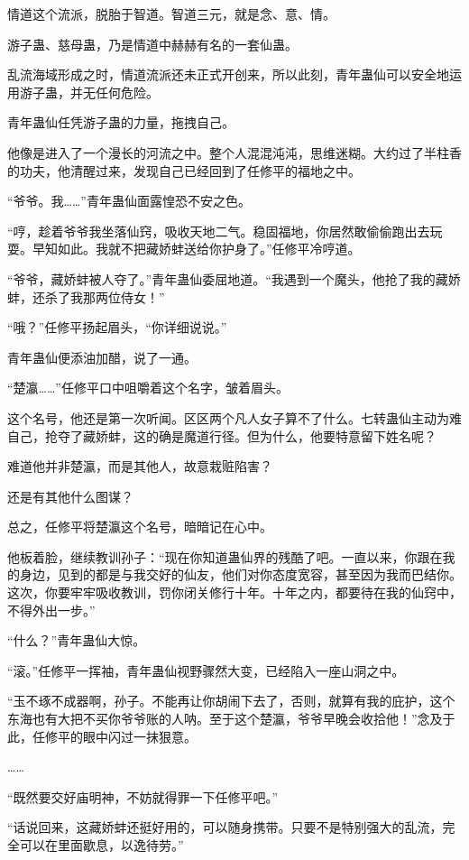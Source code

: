 \begin{this_body}
情道这个流派，脱胎于智道。智道三元，就是念、意、情。

游子蛊、慈母蛊，乃是情道中赫赫有名的一套仙蛊。

乱流海域形成之时，情道流派还未正式开创来，所以此刻，青年蛊仙可以安全地运用游子蛊，并无任何危险。

青年蛊仙任凭游子蛊的力量，拖拽自己。

他像是进入了一个漫长的河流之中。整个人混混沌沌，思维迷糊。大约过了半柱香的功夫，他清醒过来，发现自己已经回到了任修平的福地之中。

“爷爷。我……”青年蛊仙面露惶恐不安之色。

“哼，趁着爷爷我坐落仙窍，吸收天地二气。稳固福地，你居然敢偷偷跑出去玩耍。早知如此。我就不把藏娇蚌送给你护身了。”任修平冷哼道。

“爷爷，藏娇蚌被人夺了。”青年蛊仙委屈地道。“我遇到一个魔头，他抢了我的藏娇蚌，还杀了我那两位侍女！”

“哦？”任修平扬起眉头，“你详细说说。”

青年蛊仙便添油加醋，说了一通。

“楚瀛……”任修平口中咀嚼着这个名字，皱着眉头。

这个名号，他还是第一次听闻。区区两个凡人女子算不了什么。七转蛊仙主动为难自己，抢夺了藏娇蚌，这的确是魔道行径。但为什么，他要特意留下姓名呢？

难道他并非楚瀛，而是其他人，故意栽赃陷害？

还是有其他什么图谋？

总之，任修平将楚瀛这个名号，暗暗记在心中。

他板着脸，继续教训孙子：“现在你知道蛊仙界的残酷了吧。一直以来，你跟在我的身边，见到的都是与我交好的仙友，他们对你态度宽容，甚至因为我而巴结你。这次，你要牢牢吸收教训，罚你闭关修行十年。十年之内，都要待在我的仙窍中，不得外出一步。”

“什么？”青年蛊仙大惊。

“滚。”任修平一挥袖，青年蛊仙视野骤然大变，已经陷入一座山洞之中。

“玉不琢不成器啊，孙子。不能再让你胡闹下去了，否则，就算有我的庇护，这个东海也有大把不买你爷爷账的人呐。至于这个楚瀛，爷爷早晚会收拾他！”念及于此，任修平的眼中闪过一抹狠意。

……

“既然要交好庙明神，不妨就得罪一下任修平吧。”

“话说回来，这藏娇蚌还挺好用的，可以随身携带。只要不是特别强大的乱流，完全可以在里面歇息，以逸待劳。”


\end{this_body}
